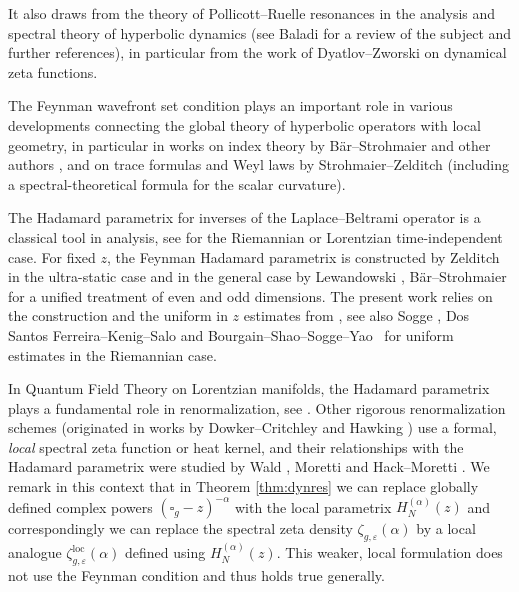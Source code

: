 \documentclass[JEP,XML,SOM,Unicode]{cedram}
\theoremstyle{definition}
\newcommand\loc{\mathrm{loc}}
\let\cv\alpha
\begin{document}
It also draws from the theory of Pollicott--Ruelle resonances \cite{Pollicott1986,Ruelle1986} in the analysis and spectral theory
of hyperbolic dynamics (see Baladi \cite{Baladi2018} for a review of the subject and further references), in particular from the work of Dyatlov--Zworski \cite{Dyatlov2016} on dynamical zeta functions.

The Feynman wavefront set condition plays an important role in various
developments connecting the global theory of hyperbolic operators with
local geometry, in particular in works on index theory by Bär--Strohmaier and other authors \cite{Bar2019,Baer2020,Shen2021}, and on trace formulas and Weyl laws by Strohmaier--Zelditch \cite{Strohmaier2020b,Strohmaier2020,Strohmaier2020a} (including a spectral-theoretical formula for the scalar curvature).

The Hadamard parametrix for inverses of the Laplace--Beltrami operator is a classical tool in analysis, see \eg \cite{HormanderIII,soggeHangzhou,StevenZelditch2012,Zelditch2017} for the Riemannian or Lorentzian time-independent case. For fixed $z$, the Feynman Hadamard parametrix is constructed by Zelditch \cite{StevenZelditch2012} in the ultra-static case and in the general case by Lewandowski \cite{Lewandowski2020}, \cf Bär--Strohmaier \cite{Baer2020} for a unified treatment of even and odd dimensions. The present work relies on the construction and the uniform in $z$ estimates from \cite{Dang2020}, see also Sogge \cite{Sogge1988}, Dos Santos Ferreira--Kenig--Salo \cite{Ferreira2014} and Bourgain--Shao--Sogge--Yao~\cite{Bourgain2015} for uniform estimates in the Riemannian case.

In Quantum Field Theory on Lorentzian manifolds, the Hadamard parametrix plays a fundamental role in renormalization, see \eg \cite{DeWitt1975,Fulling1989,Kay1991,Radzikowski1996,Moretti1999,Brunetti2000,Hollands2001}. Other rigorous renormalization schemes (originated in works by Dowker--Critchley \cite{Dowker1976} and Hawking \cite{Hawking1977}) use a formal, \emph{local} spectral zeta function or heat kernel, and their relationships with the Hadamard parametrix were studied by Wald \cite{Wald1979}, Moretti \cite{Moretti1999,morettilong} and Hack--Moretti \cite{Hack2012a}. We remark in this context that in Theorem \ref{thm:dynres} we can replace globally defined complex powers $(\square_g-z)^{-\cv}$ with the local parametrix $H_N^{(\cv)}(z)$ and correspondingly we can replace the spectral zeta density $\zeta_{g,\varepsilon}(\cv)$ by a local analogue $\zeta_{g,\varepsilon}^{\loc}(\cv)$ defined using $H_N^{(\cv)}(z)$. This weaker, local formulation does not use the Feynman condition and thus holds true generally.
\end{document}
